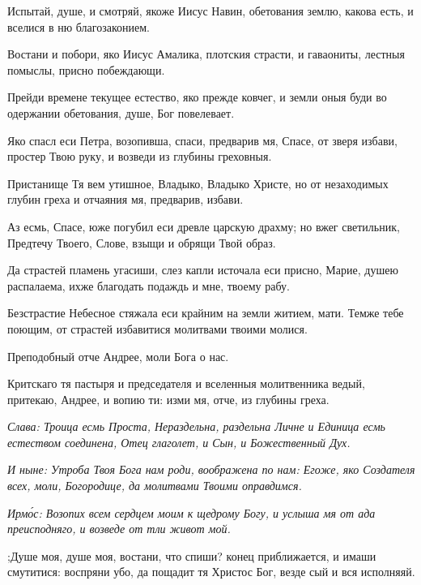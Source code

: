Испытай, душе, и смотряй, якоже Иисус Навин, обетования землю, какова есть, и вселися в ню благозаконием.

Востани и побори, яко Иисус Амалика, плотския страсти, и гаваониты, лестныя помыслы, присно побеждающи.

Прейди времене текущее естество, яко прежде ковчег, и земли оныя буди во одержании обетования, душе, Бог повелевает.

Яко спасл еси Петра, возопивша, спаси, предварив мя, Спасе, от зверя избави, простер Твою руку, и возведи из глубины греховныя.

Пристанище Тя вем утишное, Владыко, Владыко Христе, но от незаходимых глубин греха и отчаяния мя, предварив, избави.

Аз есмь, Спасе, юже погубил еси древле царскую драхму; но вжег светильник, Предтечу Твоего, Слове, взыщи и обрящи Твой образ.


Да страстей пламень угасиши, слез капли источала еси присно, Марие, душею распалаема, ихже благодать подаждь и мне, твоему рабу.


Безстрастие Небесное стяжала еси крайним на земли житием, мати. Темже тебе поющим, от страстей избавитися молитвами твоими молися.

Преподобный отче Андрее, моли Бога о нас.

Критскаго тя пастыря и председателя и вселенныя молитвенника ведый, притекаю, Андрее, и вопию ти: изми мя, отче, из глубины греха.

\itshape Слава\normalfont{}: Троица есмь Проста, Нераздельна, раздельна Личне и Единица есмь естеством соединена, Отец глаголет, и Сын, и Божественный Дух.

\itshape И ныне\normalfont{}: Утроба Твоя Бога нам роди, воображена по нам: Егоже, яко Создателя всех, моли, Богородице, да молитвами Твоими оправдимся.

\itshape Ирм\'{о}с\normalfont{}: Возопих всем сердцем моим к щедрому Богу, и услыша мя от ада преисподняго, и возведе от тли живот мой. 


;Душе моя, душе моя, востани, что спиши? конец приближается, и имаши смутитися: воспряни убо, да пощадит тя Христос Бог, везде сый и вся исполняяй. 


